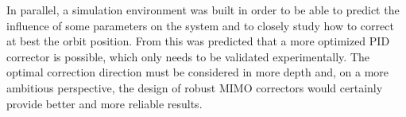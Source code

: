 In parallel, a simulation environment was built in order to be able to predict the influence of some parameters on the system and to closely study how to correct at best the orbit position. From this was predicted that a more optimized PID corrector is possible, which only needs to be validated experimentally. The optimal correction direction must be considered in more depth and, on a more ambitious perspective, the design of robust MIMO correctors would certainly provide better and more reliable results.